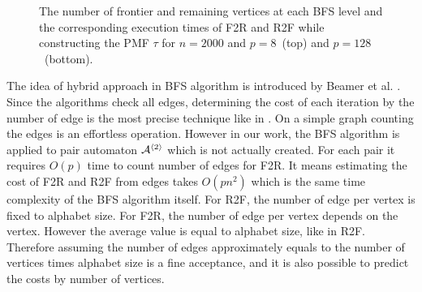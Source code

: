 \documentclass[12pt]{article}
\newcommand{\comment}[2]{{\color{red}{\bf (#1: #2)}}}
\begin{document}
\begin{figure}[ht]
{	}
	\caption{The number of frontier and remaining vertices at each BFS level and the corresponding execution times of F2R and R2F while constructing the PMF $\tau$ for $n = 2000$ and $p = 8$~(top) and $p=128$~(bottom). 
\comment{sertac}{sayilardaki virguller nokta olmali.}}%
	
	\label{fig:BFS-vtcomparison}
\end{figure}

The idea of hybrid approach in BFS algorithm is introduced by Beamer et al. \cite{Beamer}. Since the algorithms check all edges, determining the cost of each iteration by the number of edge is the most precise technique like in \cite{Beamer}. On a simple graph counting the edges is an effortless operation. However in our work, the BFS algorithm is applied to pair automaton ${\cal A}^{\langle 2 \rangle}$ which is not actually created. For each pair it requires $O(p)$ time to count number of edges for F2R. It means estimating the cost of F2R and R2F from edges takes $O(pn^2)$ which is the same time complexity of the BFS algorithm itself. For R2F, the number of edge per vertex is fixed to alphabet size. For F2R, the number of edge per vertex depends on the vertex. However the average value is equal to alphabet size, like in R2F. Therefore assuming the number of edges approximately equals to the number of vertices times alphabet size is a fine acceptance, and it is also possible to predict the costs by number of vertices.
\end{document}

